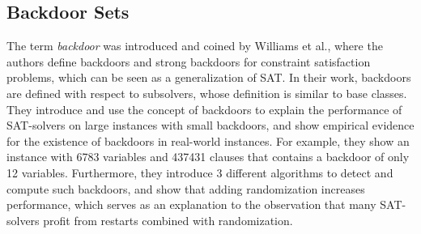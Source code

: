 \documentclass[11pt,a4paper]{article}
\theoremstyle{definition}
\theoremstyle{proposition}
\begin{document}
\subsection{Backdoor Sets}
The term \textit{backdoor} was introduced and coined by Williams et al.\cite{typicalCaseComplexity}, where the authors define backdoors and strong backdoors for constraint satisfaction problems, which can be seen as a generalization of SAT. In their work, backdoors are defined with respect to subsolvers, whose definition is similar to base classes. They introduce and use the concept of backdoors to explain the performance of SAT-solvers on large instances with small backdoors, and show empirical evidence for the existence of backdoors in real-world instances. For example, they show an instance with 6783 variables and 437431 clauses that contains a backdoor of only 12 variables. Furthermore, they introduce 3 different algorithms to detect and compute such backdoors, and show that adding randomization increases performance, which serves as an explanation to the observation that many SAT-solvers profit from restarts combined with randomization. 
\end{document}
